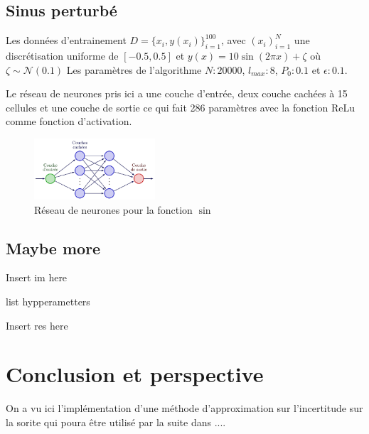 \documentclass[french,12pt]{article}
\begin{document}
\subsection{Sinus perturbé}


Les données d'entrainement $D = \{x_i , y(x_i)\}_{i = 1}^{100}$, avec $(x_i)_{i = 1}^N$
une discrétisation uniforme de $[-0.5, 0.5]$ et $y(x) = 10 \sin(2 \pi x) + \zeta$ où $\zeta \sim \mathcal{N}(0.1)$
Les paramètres de l'algorithme $N : 20000$, $l_{max} : 8$, $P_0 : 0.1$ et $\epsilon : 0.1$.

Le réseau de neurones pris ici a une couche d'entrée, deux couche cachées à 15 cellules et une couche de sortie ce qui
fait 286 paramètres avec la fonction ReLu comme fonction d'activation.


\begin{figure}[H]
    \centering
    \includegraphics[width = 0.4\textwidth]{FNN/Images/fnnSin/fnnSin_page-0001.jpg}
    \caption[short]{Réseau de neurones pour la fonction $\sin$}
\end{figure}



\subsection{Maybe more}

Insert im here

list hypperametters

Insert res here


\pagebreak
\section{Conclusion et perspective}
On a vu ici l'implémentation d'une méthode d'approximation sur l'incertitude
sur la sorite qui poura être utilisé par la suite dans ....

\pagebreak


\end{document}
